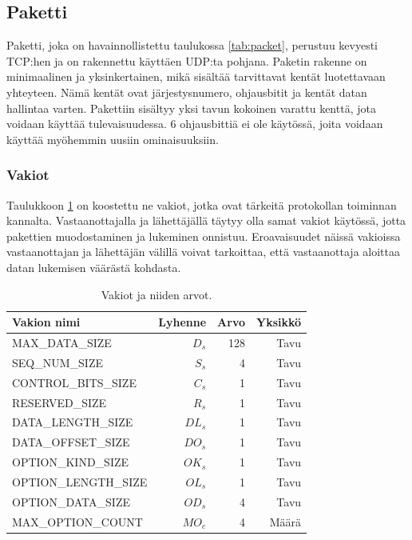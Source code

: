 \documentclass[a4paper,12pt]{article}
\begin{document}
    \subsection{Paketti}\label{sec:paketti}
    Paketti, joka on havainnollistettu taulukossa \ref{tab:packet}, perustuu kevyesti TCP:hen ja on rakennettu käyttäen UDP:ta pohjana. Paketin rakenne on minimaalinen ja yksinkertainen, mikä sisältää tarvittavat kentät luotettavaan yhteyteen. Nämä kentät ovat järjestysnumero, ohjausbitit ja kentät datan hallintaa varten. Pakettiin sisältyy yksi tavun kokoinen varattu kenttä, jota voidaan käyttää tulevaisuudessa. 6 ohjausbittiä ei ole käytössä, joita voidaan käyttää myöhemmin uusiin ominaisuuksiin.

    \subsubsection*{Vakiot}
    Taulukkoon \ref{tab:vakiot} on koostettu ne vakiot, jotka ovat tärkeitä protokollan toiminnan kannalta. Vastaanottajalla ja lähettäjällä täytyy olla samat vakiot käytössä, jotta pakettien muodostaminen ja lukeminen onnistuu. Eroavaisuudet näissä vakioissa vastaanottajan ja lähettäjän välillä voivat tarkoittaa, että vastaanottaja aloittaa datan lukemisen väärästä kohdasta.

    \begin{table}[h!]
        \centering
        \caption{Vakiot ja niiden arvot.}
        \label{tab:vakiot}
        \begin{tabularx}{\textwidth}{|X|r|r|r|}
        \hline
            \textbf{Vakion nimi}          & \textbf{Lyhenne} & \textbf{Arvo} & \textbf{Yksikkö} \\ \hline
            MAX\_DATA\_SIZE      & $D_s$   & 128  & Tavu    \\ \hline
            SEQ\_NUM\_SIZE       & $S_s$   & 4    & Tavu    \\ \hline
            CONTROL\_BITS\_SIZE  & $C_s$   & 1    & Tavu    \\ \hline
            RESERVED\_SIZE       & $R_s$   & 1    & Tavu    \\ \hline
            DATA\_LENGTH\_SIZE   & $DL_s$  & 1    & Tavu    \\ \hline
            DATA\_OFFSET\_SIZE   & $DO_s$  & 1    & Tavu    \\ \hline
            OPTION\_KIND\_SIZE   & $OK_s$  & 1    & Tavu    \\ \hline
            OPTION\_LENGTH\_SIZE & $OL_s$  & 1    & Tavu    \\ \hline
            OPTION\_DATA\_SIZE   & $OD_s$  & 4    & Tavu    \\ \hline
            MAX\_OPTION\_COUNT   & $MO_c$  & 4    & Määrä \\  \hline
        \end{tabularx}
    \end{table}
\end{document}
